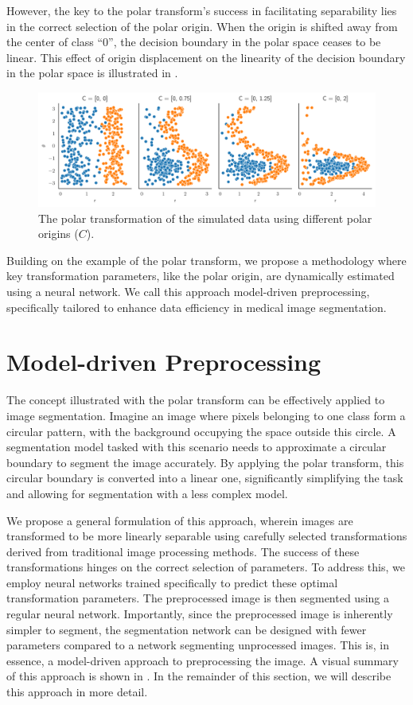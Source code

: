 However, the key to the polar transform's success in facilitating separability lies in the correct selection of the polar origin. When the origin is shifted away from the center of class ``0'', the decision boundary in the polar space ceases to be linear. This effect of origin displacement on the linearity of the decision boundary in the polar space is illustrated in .

 	\begin{figure}[h]
		\centering
		\includegraphics[width=\linewidth]{images/4/data_polar_origin}
		\caption{The polar transformation of the simulated data using different polar origins ($C$).}
		\label{fig:polar-origin-selection}
	\end{figure}
	
	Building on the example of the polar transform, we propose a methodology where key transformation parameters, like the polar origin, are dynamically estimated using a neural network. We call this approach model-driven preprocessing, specifically tailored to enhance data efficiency in medical image segmentation.
	
\section{Model-driven Preprocessing}

The concept illustrated with the polar transform can be effectively applied to image segmentation. Imagine an image where pixels belonging to one class form a circular pattern, with the background occupying the space outside this circle. A segmentation model tasked with this scenario needs to approximate a circular boundary to segment the image accurately. By applying the polar transform, this circular boundary is converted into a linear one, significantly simplifying the task and allowing for segmentation with a less complex model.

We propose a general formulation of this approach, wherein images are transformed to be more linearly separable using carefully selected transformations derived from traditional image processing methods. The success of these transformations hinges on the correct selection of parameters. To address this, we employ neural networks trained specifically to predict these optimal transformation parameters. The preprocessed image is then segmented using a regular neural network. Importantly, since the preprocessed image is inherently simpler to segment, the segmentation network can be designed with fewer parameters compared to a network segmenting unprocessed images. This is, in essence, a model-driven approach to preprocessing the image. A visual summary of this approach is shown in . In the remainder of this section, we will describe this approach in more detail.

